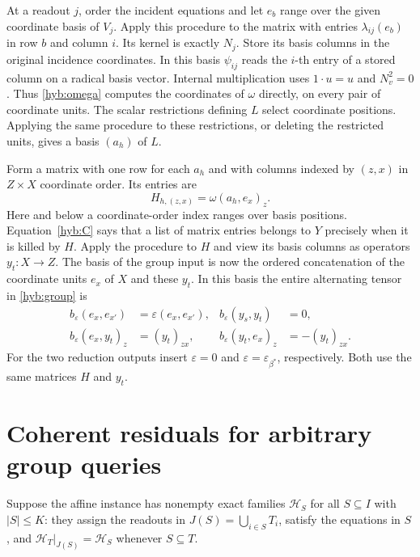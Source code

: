 \documentclass[11pt]{article}
\theoremstyle{definition}
\theoremstyle{remark}
\numberwithin{equation}{section}
\begin{document}
At a readout $j$, order the incident equations and let $e_b$ range over
the given coordinate basis of $V_j$. Apply this procedure to the matrix
with entries $\lambda_{ij}(e_b)$ in row $b$ and column $i$. Its kernel
is exactly $N_j$. Store its basis columns in the original incidence
coordinates. In this basis $\psi_{ij}$ reads the $i$-th entry of a
stored column on a radical basis vector. Internal multiplication uses
$1\cdot u=u$ and $N_v^2=0$. Thus \eqref{hyb:omega} computes the
coordinates of $\omega$ directly, on every pair of coordinate units.
The scalar restrictions defining $L$ select coordinate positions.
Applying the same procedure to these restrictions, or deleting
the restricted units, gives a basis $(a_h)$ of $L$.

Form a matrix with one row for each $a_h$ and with columns indexed by
$(z,x)$ in $Z\times X$ coordinate order. Its entries are
\[
           H_{h,(z,x)}=\omega(a_h,e_x)_z .
\]
Here and below a coordinate-order index ranges over basis positions.
Equation~\eqref{hyb:C} says that a list of matrix entries belongs
to $Y$ precisely when it is killed by $H$. Apply the procedure to
$H$ and view its basis columns as operators $y_t:X\to Z$.
The basis of the group input is now the ordered concatenation
of the coordinate units $e_x$ of $X$ and these $y_t$.
In this basis the entire alternating tensor in \eqref{hyb:group} is
\begin{equation}
 \begin{aligned}
 b_\varepsilon(e_x,e_{x'})&=\varepsilon(e_x,e_{x'}),&
 b_\varepsilon(y_s,y_t)&=0,\\
 b_\varepsilon(e_x,y_t)_z&=(y_t)_{zx},&
 b_\varepsilon(y_t,e_x)_z&=-(y_t)_{zx}.
 \end{aligned}
 \label{eq:computed-bracket}
\end{equation}
For the two reduction outputs insert $\varepsilon=0$ and
$\varepsilon=\varepsilon_{\beta^*}$, respectively. Both use the same
matrices $H$ and $y_t$.

\section{Coherent residuals for arbitrary group queries}
\label{hyb:residuals}

Suppose the affine instance has nonempty exact families
$\mathcal H_S$ for all $S\subseteq I$ with $|S|\le K$:
they assign the readouts in $J(S)=\bigcup_{i\in S}T_i$, satisfy the
equations in $S$, and
$\mathcal H_T|_{J(S)}=\mathcal H_S$ whenever $S\subseteq T$.
\end{document}

